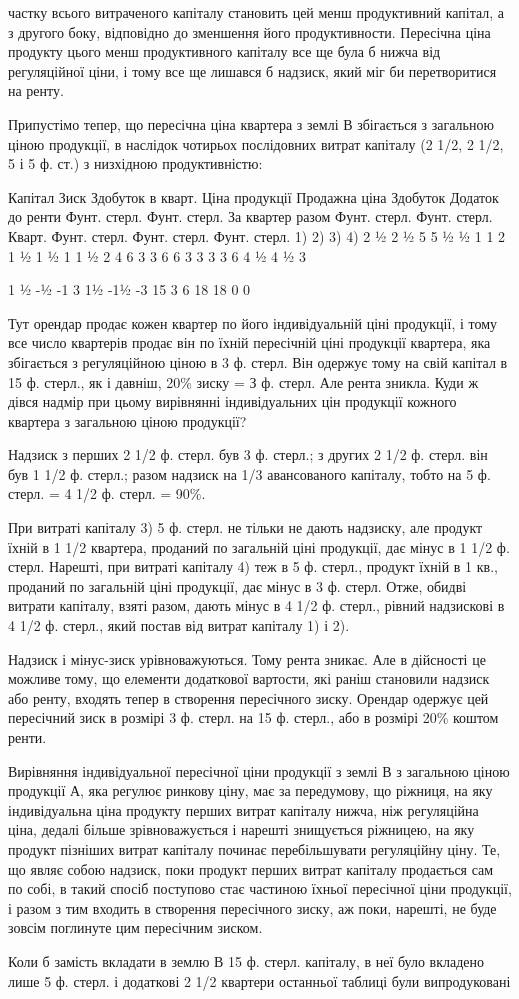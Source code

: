 частку всього витраченого капіталу становить цей менш продуктивний капітал,
а з другого боку, відповідно до зменшення його продуктивности. Пересічна
ціна продукту цього менш продуктивного капіталу все ще була б нижча
від регуляційної ціни, і тому все ще лишався б надзиск, який міг би перетворитися
на ренту.

Припустімо тепер, що пересічна ціна квартера з землі В збігається з загальною
ціною продукції, в наслідок чотирьох послідовних витрат капіталу
(2  1/2, 2  1/2, 5 і 5 ф. ст.) з низхідною продуктивністю:

Капітал Зиск Здобуток в кварт. Ціна продукції Продажна ціна Здобуток Додаток до ренти
 Фунт. стерл. Фунт. стерл.  За квартер разом Фунт. стерл. Фунт. стерл. Кварт. Фунт. стерл.
    Фунт. стерл. Фунт. стерл.
1)
2)
3)
4) 2 ½
2 ½
5
5 ½
½
1
1 2
1 ½
1 ½
1
 1 ½
2
4
6 3
3
6
6 3
3
3
3 6
4 ½
4 ½
3

 1
½
-½
-1
 3
1½
-1½
-3
 15 3 6  18  18 0 0

Тут орендар продає кожен квартер по його індивідуальній ціні продукції,
і тому все число квартерів продає він по їхній пересічній ціні продукції квартера,
яка збігається з регуляційною ціною в 3 ф. стерл. Він одержує тому на свій
капітал в 15 ф. стерл., як і давніш, 20\% зиску = З ф. стерл. Але рента зникла.
Куди ж дівся надмір при цьому вирівнянні індивідуальних цін продукції кожного
квартера з загальною ціною продукції?

Надзиск з перших 2  1/2 ф. стерл. був 3 ф. стерл.; з других 2  1/2 ф. стерл.
він був 1 1/2 ф. стерл.; разом надзиск на  1/3 авансованого капіталу, тобто на
5 ф. стерл. = 4  1/2 ф. стерл. = 90\%.

При витраті капіталу 3) 5 ф. стерл. не тільки не дають надзиску, але
продукт їхній в 1 1/2 квартера, проданий по загальній ціні продукції, дає мінус в
1  1/2  ф. стерл. Нарешті, при витраті капіталу 4) теж в 5 ф. стерл., продукт
їхній в 1 кв., проданий по загальній ціні продукції, дає мінус в 3 ф. стерл. Отже,
обидві витрати капіталу, взяті разом, дають мінус в 4  1/2 ф. стерл., рівний надзискові
в 4  1/2  ф. стерл., який постав від витрат капіталу 1) і 2).

Надзиск і мінус-зиск урівноважуються. Тому рента зникає. Але в дійсності
це можливе тому, що елементи додаткової вартости, які раніш становили
надзиск або ренту, входять тепер в створення пересічного зиску. Орендар одержує
цей пересічний зиск в розмірі 3 ф. стерл. на 15 ф. стерл., або в розмірі
20\% коштом ренти.

Вирівняння індивідуальної пересічної ціни продукції з землі В з загальною
ціною продукції А, яка регулює ринкову ціну, має за передумову, що ріжниця,
на яку індивідуальна ціна продукту перших витрат капіталу нижча,
ніж регуляційна ціна, дедалі більше зрівноважується і нарешті знищується
ріжницею, на яку продукт пізніших витрат капіталу починає перебільшувати
регуляційну ціну. Те, що являє собою надзиск, поки продукт перших витрат
капіталу продається сам по собі, в такий спосіб поступово стає частиною їхньої
пересічної ціни продукції, і разом з тим входить в створення пересічного зиску,
аж поки, нарешті, не буде зовсім поглинуте цим пересічним зиском.

Коли б замість вкладати в землю В 15 ф. стерл. капіталу, в неї було вкладено
лише 5 ф. стерл. і додаткові 2  1/2 квартери останньої таблиці були випродуковані
